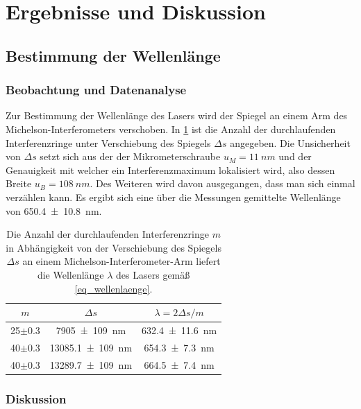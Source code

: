 \documentclass[
	a4paper,
	12pt,
	pagesize,
	ngerman
]{scrartcl}
\begin{document}
	\section{Ergebnisse und Diskussion}


	\subsection{Bestimmung der Wellenlänge}
	\subsubsection{Beobachtung und Datenanalyse}
	Zur Bestimmung der Wellenlänge des Lasers wird der Spiegel an einem Arm des Michelson-Interferometers verschoben.
	In \cref{tb_lambda} ist die Anzahl der durchlaufenden Interferenzringe unter Verschiebung des Spiegels $\Delta s$ angegeben.
	Die Unsicherheit von $\Delta s$ setzt sich aus der der Mikrometerschraube $u_M=\SI{11}{nm}$ und der Genauigkeit mit welcher ein Interferenzmaximum lokalisiert wird, also dessen Breite $u_B=\SI{108}{nm}$. %
	Des Weiteren wird davon ausgegangen, dass man sich einmal verzählen kann.
	Es ergibt sich eine über die Messungen gemittelte Wellenlänge von \SI{650.4+-10.8}{nm}.

	\begin{table}[H]
		\centering
		\begin{tabular}{| c | c | c |}
			\hline
			  $m$ &  $\Delta s$ & $\lambda=2 \Delta s/m$\\ \hline
				25$\pm$0.3 & \SI{7905+-109}{nm} & \SI{632.4+-11.6}{nm}\\
				40$\pm$0.3& \SI{13085.1+-109}{nm} & \SI{654.3+-7.3}{nm}\\
				40$\pm$0.3& \SI{13289.7+-109}{nm} & \SI{664.5+-7.4}{nm}\\
				\hline
		\end{tabular}
		\caption{Die Anzahl der durchlaufenden Interferenzringe $m$ in Abhängigkeit von der Verschiebung des Spiegels $\Delta s$ an einem Michelson-Interferometer-Arm liefert die Wellenlänge $\lambda$ des Lasers gemäß \cref{eq_wellenlaenge}. }
		\label{tb_lambda}
	\end{table}

	\subsubsection{Diskussion}
\end{document}
